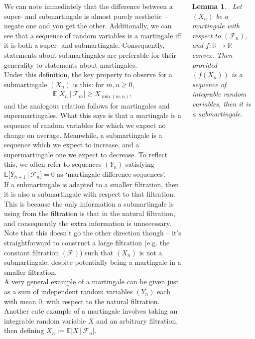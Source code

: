 \documentclass{tikzposter} %
\newtheorem{lemma}[theorem]{Lemma}
\begin{document}
\begin{columns}
{    We can note immediately that the difference between a super- and submartingale is almost purely aesthetic -- negate one and you get the other. Additionally, we can see that a sequence of random variables is a martingale iff it is both a super- and submartingale. Consequently, statements about submartingales are preferable for their generality to statements about martingales. \\

    Under this definition, the key property to observe for a submartingale $(X_{n})$ is this: for $m,n \ge 0$,
    \begin{align*}
      \mathbb{E}\big[X_{n} \,|\, \mathcal{F}_{m}\big] \ge X_{\min(m,n)},
    \end{align*}
    and the analogous relation follows for martingales and supermartingales. What this says is that a martingale is a sequence of random variables for which we expect no change on average. Meanwhile, a submartingale is a sequence which we expect to increase, and a supermartingale one we expect to decrease. To reflect this, we often refer to sequences $(Y_{n})$ satisfying $\mathbb{E}\big[Y_{n+1} \,|\, \mathcal{F}_{n}\big] = 0$ as `martingale difference sequences'. \\

    If a submartingale is adapted to a smaller filtration, then it is also a submartingale with respect to that filtration. This is because the only information a submartingale is using from the filtration is that in the natural filtration, and consequently the extra information is unnecessary. Note that this doesn't go the other direction though -- it's straightforward to construct a large filtration (e.g. the constant filtration $(\mathcal{F})$) such that $(X_{n})$ is not a submartingale, despite potentially being a martingale in a smaller filtration. \\

    A very general example of a martingale can be given just as a sum of independent random variables $(Y_{n})$ each with mean $0$, with respect to the natural filtration. Another cute example of a martingale involves taking an integrable random variable $X$ and an arbitrary filtration, then defining $X_{n} := \mathbb{E}\big[X \,|\, \mathcal{F}_{n}\big]$. \\

    \begin{lemma}
    \ Let $(X_{n})$ be a martingale with respect to $(\mathcal{F}_{n})$, and $f : \mathbb{R} \to \mathbb{R}$ convex. Then provided $(f(X_{n}))$ is a sequence of integrable random variables, then it is a submartingale.
    \end{lemma}
    \hphantom{}

}
\end{columns}
\end{document}
